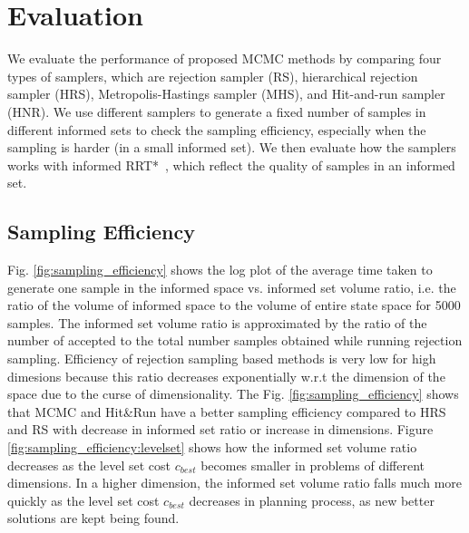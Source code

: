 \documentclass[letterpaper, 10 pt, conference]{ieeeconf}  %
\begin{document}
\section{Evaluation}
\label{sec:eval}



We evaluate the performance of proposed MCMC methods by comparing four types of samplers, which are rejection sampler (RS), hierarchical rejection sampler (HRS), Metropolis-Hastings sampler (MHS), and Hit-and-run sampler (HNR).
We use different samplers to generate a fixed number of samples in different informed sets to check the sampling efficiency, especially when the sampling is harder (in a small informed set).
We then evaluate how the samplers works with informed RRT*~\cite{GSB14}, which reflect the quality of samples in an informed set.

\subsection{Sampling Efficiency}

Fig. \ref{fig:sampling_efficiency} shows the log plot of the average time taken to generate one sample in the informed space vs. informed set volume ratio, i.e. the ratio of the volume of informed space to the volume of entire state space for 5000 samples. 
The informed set volume ratio is approximated by the ratio of the number of accepted to the total number samples obtained while running rejection sampling. Efficiency of rejection sampling based methods is very low for high dimesions because this ratio decreases exponentially w.r.t the dimension of the space due to the curse of dimensionality. 
The Fig. \ref{fig:sampling_efficiency} shows that MCMC and Hit\&Run have a better sampling efficiency compared to HRS and RS with decrease in informed set ratio or increase in dimensions. 
Figure \ref{fig:sampling_efficiency:levelset} shows how the informed set volume ratio decreases as the level set cost $ c_{best} $ becomes smaller in problems of different dimensions.
In a higher dimension, the informed set volume ratio falls much more quickly as the level set cost $ c_{best} $ decreases in planning process, as new better solutions are kept being found.
\end{document}
